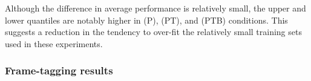 \documentclass{article}
\begin{document}
Although the difference in average performance is relatively small, the upper and lower 
quantiles are notably higher in (P), (PT), and (PTB) conditions.  This suggests a
reduction in the tendency to over-fit the relatively small training sets used in these
experiments.






\subsubsection{Frame-tagging results}
\end{document}
